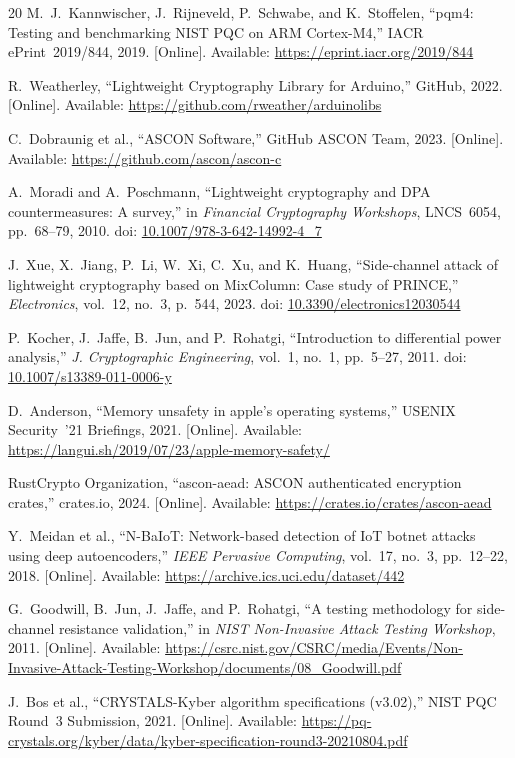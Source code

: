 \documentclass[conference]{IEEEtran}
\begin{document}
\begin{thebibliography}{20}
M.~J.~Kannwischer, J.~Rijneveld, P.~Schwabe, and K.~Stoffelen, ``pqm4:
Testing and benchmarking NIST PQC on ARM Cortex-M4,'' IACR ePrint~2019/844,
2019. [Online]. Available: \url{https://eprint.iacr.org/2019/844}

R.~Weatherley, ``Lightweight Cryptography Library for Arduino,'' GitHub, 2022.
[Online]. Available: \url{https://github.com/rweather/arduinolibs}

C.~Dobraunig et al., ``ASCON Software,'' GitHub ASCON Team, 2023. [Online].
Available: \url{https://github.com/ascon/ascon-c}

A.~Moradi and A.~Poschmann, ``Lightweight cryptography and DPA countermeasures:
A survey,'' in \textit{Financial Cryptography Workshops}, LNCS~6054,
pp.~68--79, 2010.
doi: \href{https://doi.org/10.1007/978-3-642-14992-4_7}{10.1007/978-3-642-14992-4\_7}

J.~Xue, X.~Jiang, P.~Li, W.~Xi, C.~Xu, and K.~Huang, ``Side-channel attack of
lightweight cryptography based on MixColumn: Case study of PRINCE,''
\textit{Electronics}, vol.~12, no.~3, p.~544, 2023.
doi: \href{https://doi.org/10.3390/electronics12030544}{10.3390/electronics12030544}

P.~Kocher, J.~Jaffe, B.~Jun, and P.~Rohatgi, ``Introduction to differential
power analysis,'' \textit{J. Cryptographic Engineering}, vol.~1, no.~1,
pp.~5--27, 2011.
doi: \href{https://doi.org/10.1007/s13389-011-0006-y}{10.1007/s13389-011-0006-y}

D.~Anderson, ``Memory unsafety in apple's operating systems,'' USENIX
Security~'21 Briefings, 2021. [Online]. Available:
\url{https://langui.sh/2019/07/23/apple-memory-safety/}

RustCrypto Organization, ``ascon-aead: ASCON authenticated encryption crates,''
crates.io, 2024. [Online]. Available: \url{https://crates.io/crates/ascon-aead}

Y.~Meidan et al., ``N-BaIoT: Network-based detection of IoT botnet attacks
using deep autoencoders,'' \textit{IEEE Pervasive Computing}, vol.~17, no.~3,
pp.~12--22, 2018.
[Online]. Available: \url{https://archive.ics.uci.edu/dataset/442}

G.~Goodwill, B.~Jun, J.~Jaffe, and P.~Rohatgi, ``A testing methodology for
side-channel resistance validation,'' in \textit{NIST Non-Invasive Attack
Testing Workshop}, 2011. [Online]. Available:
\url{https://csrc.nist.gov/CSRC/media/Events/Non-Invasive-Attack-Testing-Workshop/documents/08_Goodwill.pdf}

J.~Bos et al., ``CRYSTALS-Kyber algorithm specifications (v3.02),''
NIST PQC Round~3 Submission, 2021. [Online]. Available:
\url{https://pq-crystals.org/kyber/data/kyber-specification-round3-20210804.pdf}

\end{thebibliography}
\end{document}
